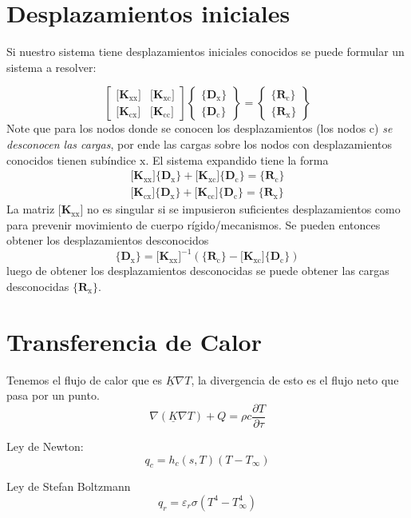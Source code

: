 \documentclass[11pt, a4paper,titlepage]{article}
\newcommand{\Mme}[1]{\boldsymbol{[}\mathbf{#1} \boldsymbol{]}}
\newcommand{\Cme}[1]{\boldsymbol{\{ }\mathbf{#1} \boldsymbol{\}} }
\newcommand{\CDx}{\Cme{D_{\mathrm{x}}}}
\newcommand{\CDc}{\Cme{D_{\mathrm{c}}}}
\newcommand{\CRx}{\Cme{R_{\mathrm{x}}}}
\newcommand{\CRc}{\Cme{R_{\mathrm{c}}}}
\newcommand{\MKxx}{\Mme{K_{\mathrm{xx}}}}
\newcommand{\MKcc}{\Mme{K_{\mathrm{cc}}}}
\newcommand{\MKxc}{\Mme{K_{\mathrm{xc}}}}
\newcommand{\MKcx}{\Mme{K_{\mathrm{cx}}}}
\newcommand{\feaTP}{null.tex}
\begin{document}
\section{Desplazamientos iniciales} \label{sec:desplzImpuestos}
Si nuestro sistema tiene desplazamientos iniciales conocidos se puede formular un sistema a resolver:

\begin{equation}
	\begin{bmatrix}
	\MKxx & \MKxc \\
	\MKcx & \MKcc
	\end{bmatrix}
	\begin{Bmatrix}
	\CDx \\
	\CDc 
	\end{Bmatrix}
	=	\begin{Bmatrix}
	\CRc \\
	\CRx 
	\end{Bmatrix}
\end{equation} 
Note que para los nodos donde se conocen los desplazamientos (los nodos $\mathrm{c}$) \textit{se desconocen las cargas}, por ende las cargas sobre los nodos con desplazamientos conocidos tienen subíndice $\mathrm{x}$. El sistema expandido tiene la forma
\begin{gather*} 
	\MKxx \CDx + \MKxc \CDc = \CRc \\
	\MKcx \CDx + \MKcc \CDc = \CRx 
\end{gather*}
La matriz $\MKxx$ no es singular si se impusieron suficientes desplazamientos como para prevenir movimiento de cuerpo rígido/mecanismos. Se pueden entonces obtener los desplazamientos desconocidos
\[
\CDx = \MKxx^{-1} \left( \CRc - \MKxc  \CDc \right)
\]
luego de obtener los desplazamientos desconocidas se puede obtener las cargas desconocidas $\CRx$.






\section{Transferencia de Calor}

Tenemos el flujo de calor que es $\underline{K} \nabla T$, la divergencia de esto es el flujo neto que pasa por un punto.
\[
\nabla(\underline{K} \nabla T)+Q=\rho c \frac{\partial T}{\partial \tau}
\] 

Ley de Newton: 
\[
q_{c}=h_{c}(s, T)\left(T-T_{\infty}\right)
\]

Ley de Stefan Boltzmann
\[
q_{r}=\varepsilon_{r} \sigma\left(T^{4}-T_{\infty}^{4}\right)
\]
\end{document}
